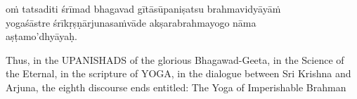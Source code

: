 \begin{transliteration}
oṁ tatsaditi śrīmad bhagavad gītāsūpaniṣatsu brahmavidyāyāṁ \\
yogaśāstre śrīkṛṣṇārjunasaṁvāde akṣarabrahmayogo nāma \\
aṣṭamo'dhyāyaḥ.
\end{transliteration}

Thus, in the UPANISHADS of the glorious Bhagawad-Geeta, in the Science of the
Eternal, in the scripture of YOGA, in the dialogue between Sri Krishna and
Arjuna, the eighth discourse ends entitled: The Yoga of Imperishable Brahman
